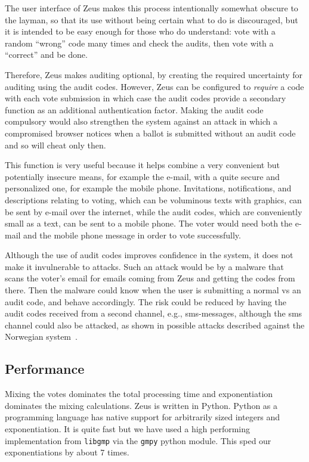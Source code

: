 \documentclass[letterpaper,10pt]{article}
\begin{document}
The user interface of Zeus makes this process intentionally somewhat
obscure to the layman, so that its use without being certain what to
do is discouraged, but it is intended to be easy enough for those who
do understand: vote with a random ``wrong'' code many times and check
the audits, then vote with a ``correct'' and be done.

Therefore, Zeus makes auditing optional, by creating the required
uncertainty for auditing using the audit codes.
However, Zeus can be configured to \emph{require} a code with each vote
submission in which case the audit codes provide a secondary function
as an additional authentication factor. Making the audit code
compulsory would also strengthen the system against an attack in which
a compromised browser notices when a ballot is submitted without an
audit code and so will cheat only then.

This function is very useful because it helps combine a very convenient
but potentially insecure means, for example the e-mail,
with a quite secure and personalized one, for example the mobile phone.
Invitations, notifications, and descriptions relating to voting,
which can be voluminous texts with graphics,
can be sent by e-mail over the internet,
while the audit codes, which are conveniently small as a text,
can be sent to a mobile phone.
The voter would need both the e-mail and the mobile phone message in
order to vote successfully.

Although the use of audit codes improves confidence in the system, it
does not make it invulnerable to attacks. Such an attack would be by a
malware that scans the voter's email for emails coming from Zeus and
getting the codes from there. Then the malware could know when the
user is submitting a normal vs an audit code, and behave accordingly.
The risk could be reduced by having the audit codes received from a
second channel, e.g., {\sc sms}-messages, although the {\sc sms}
channel could also be attacked, as shown in possible attacks described
against the Norwegian system~\cite{koenig:2013}.


\subsection{Performance}
\label{sec:performance}
Mixing the votes dominates the total processing time
and exponentiation dominates the mixing calculations.
Zeus is written in Python. 
Python as a programming language has native support for arbitrarily
sized integers and exponentiation.
It is quite fast but we have used a high performing implementation
from \texttt{libgmp} via the \texttt{gmpy} python module.
This sped our exponentiations by about 7 times.
\end{document}
